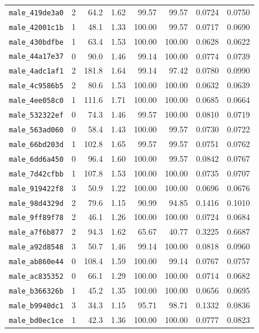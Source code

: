 \documentclass[11pt]{article}
\begin{document}
\begin{longtable}{lrrrrrrr}
\texttt{male\_419de3a0} & 2 & 64.2 & 1.62 & 99.57 & 99.57 & 0.0724 & 0.0750 \\
\texttt{male\_42001c1b} & 1 & 48.1 & 1.33 & 100.00 & 99.57 & 0.0717 & 0.0690 \\
\texttt{male\_430bdfbe} & 1 & 63.4 & 1.53 & 100.00 & 100.00 & 0.0628 & 0.0622 \\
\texttt{male\_44a17e37} & 0 & 90.0 & 1.46 & 99.14 & 100.00 & 0.0774 & 0.0739 \\
\texttt{male\_4adc1af1} & 2 & 181.8 & 1.64 & 99.14 & 97.42 & 0.0780 & 0.0990 \\
\texttt{male\_4c9586b5} & 2 & 80.6 & 1.53 & 100.00 & 100.00 & 0.0632 & 0.0639 \\
\texttt{male\_4ee058c0} & 1 & 111.6 & 1.71 & 100.00 & 100.00 & 0.0685 & 0.0664 \\
\texttt{male\_532322ef} & 0 & 74.3 & 1.46 & 99.57 & 100.00 & 0.0810 & 0.0719 \\
\texttt{male\_563ad060} & 0 & 58.4 & 1.43 & 100.00 & 99.57 & 0.0730 & 0.0722 \\
\texttt{male\_66bd203d} & 1 & 102.8 & 1.65 & 99.57 & 99.57 & 0.0751 & 0.0762 \\
\texttt{male\_6dd6a450} & 0 & 96.4 & 1.60 & 100.00 & 99.57 & 0.0842 & 0.0767 \\
\texttt{male\_7d42cfbb} & 1 & 107.8 & 1.53 & 100.00 & 100.00 & 0.0735 & 0.0707 \\
\texttt{male\_919422f8} & 3 & 50.9 & 1.22 & 100.00 & 100.00 & 0.0696 & 0.0676 \\
\texttt{male\_98d4329d} & 2 & 79.6 & 1.15 & 90.99 & 94.85 & 0.1416 & 0.1010 \\
\texttt{male\_9ff89f78} & 2 & 46.1 & 1.26 & 100.00 & 100.00 & 0.0724 & 0.0684 \\
\texttt{male\_a7f6b877} & 2 & 94.3 & 1.62 & 65.67 & 40.77 & 0.3225 & 0.6687 \\
\texttt{male\_a92d8548} & 3 & 50.7 & 1.46 & 99.14 & 100.00 & 0.0818 & 0.0960 \\
\texttt{male\_ab860e44} & 0 & 108.4 & 1.59 & 100.00 & 99.14 & 0.0767 & 0.0757 \\
\texttt{male\_ac835352} & 0 & 66.1 & 1.29 & 100.00 & 100.00 & 0.0714 & 0.0682 \\
\texttt{male\_b366326b} & 1 & 45.2 & 1.35 & 100.00 & 100.00 & 0.0656 & 0.0695 \\
\texttt{male\_b9940dc1} & 3 & 34.3 & 1.15 & 95.71 & 98.71 & 0.1332 & 0.0836 \\
\texttt{male\_bd0ec1ce} & 1 & 42.3 & 1.36 & 100.00 & 100.00 & 0.0777 & 0.0823 \\

\end{longtable}
\end{document}
